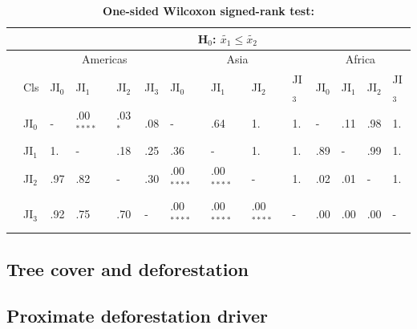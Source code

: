 			\begin{table}[ht]
				\centering
				\caption[One-sided Wilcoxon signed-rank test]{\textbf{One-sided Wilcoxon signed-rank test:}}
				\label{tab:wilcoxononesided}
				\begin{tabular}{llllllllllllll}
					\hline
					& & \multicolumn{12}{c}{H$_0$: $\tilde{x_1}\leq\tilde{x_2}$} \\\hline
					& & \multicolumn{4}{c}{Americas} & \multicolumn{4}{c}{Asia} & \multicolumn{4}{c}{Africa} \\
					& Cls & JI$_0$ & JI$_1$ & JI$_2$ & JI$_3$ & JI$_0$ & JI$_1$ & JI$_2$ & JI$_3$ & JI$_0$ & JI$_1$ & JI$_2$ & JI$_3$ \\\hline
					\multirow{4}{*}{\STAB{\rotatebox[origin=c]{90}{H$_0$: $\tilde{x_1}\geq\tilde{x_2}$}}} & JI$_0$ & - & .00$^{****}$ & .03$^{*}$ & .08 & - & .64 & 1. & 1. & - & .11 & .98 & 1. \\
					& JI$_1$ & 1. & - & .18 & .25 & .36 & - & 1. & 1. & .89 & - & .99 & 1. \\
					& JI$_2$ & .97 & .82 & - & .30 & .00$^{****}$ & .00$^{****}$ & - & 1. & .02 & .01 & - & 1. \\
					& JI$_3$ & .92 & .75 & .70 & - & .00$^{****}$ & .00$^{****}$ & .00$^{****}$ & - & .00 & .00 & .00 & - \\\hline
				\end{tabular}
			\end{table}

		\subsection{Tree cover and deforestation}
		\label{subsec:results_tree_cover_and_deforestation}
			\note{}

		\subsection{Proximate deforestation driver}
		\label{subsec:results_proxy_deforestation_driver}

